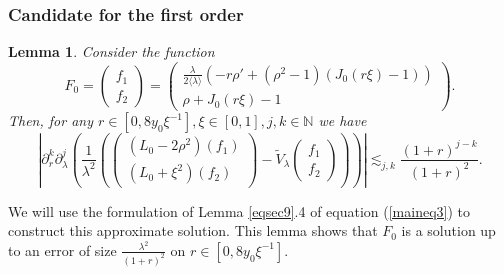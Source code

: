 \documentclass[11 pt]{amsart}
\newtheorem{lem}{Lemma}[section]
\theoremstyle{definition}
\theoremstyle{remark}
\numberwithin{equation}{section}
\begin{document}
\subsubsection{Candidate for the first order}

\begin{lem}
  \label{f0f}Consider the function
  \[ F_0 = \left(\begin{array}{c}
       f_1\\
       f_2
     \end{array}\right) = \left(\begin{array}{c}
       \frac{\lambda}{2 \langle \lambda \rangle}  (- r \rho' + (\rho^2 - 1)
       (J_0 (r \xi) - 1))\\
       \rho + J_0 (r \xi) - 1
     \end{array}\right) . \]
  Then, for any $r \in [0, 8 y_0 \xi^{- 1}], \xi \in [0, 1], j, k \in \mathbb{N}$
  we have
  \[ \left| \partial_r^k \partial_{\lambda}^j \left( \frac{1}{\lambda^2}
     \left( \left(\begin{array}{c}
       (L_0 - 2 \rho^2) (f_1)\\
       (L_0 + \xi^2) (f_2)
     \end{array}\right) - \widetilde{V}_{\lambda} \left(\begin{array}{c}
       f_1\\
       f_2
     \end{array}\right) \right) \right) \right| \lesssim_{j, k} \frac{(1 +
     r)^{j - k}}{(1 + r)^2} . \]
\end{lem}
We will use the formulation of Lemma \ref{eqsec9}.4 of equation (\ref{maineq3}) to construct this approximate solution. This lemma shows that $F_0$ is a solution up to an error of size $\frac{\lambda^2}{(1 + r)^2}$ on $r
\in [0, 8 y_0 \xi^{- 1}]$.
\end{document}
